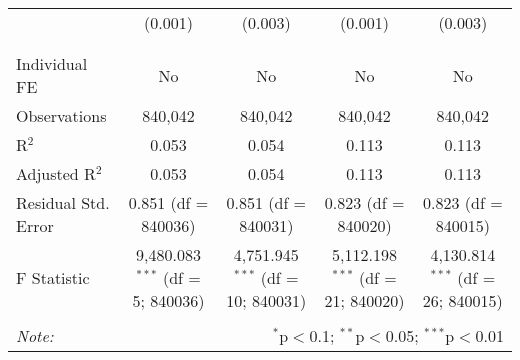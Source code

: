 \documentclass[
]{article}
\begin{document}
\begin{table}[!htbp]
{\begin{tabular}{@{\extracolsep{5pt}}lcccc}
  & (0.001) & (0.003) & (0.001) & (0.003) \\ 
  & & & & \\ 
\hline \\[-1.8ex] 
Individual FE & No & No & No & No \\ 
Observations & 840,042 & 840,042 & 840,042 & 840,042 \\ 
R$^{2}$ & 0.053 & 0.054 & 0.113 & 0.113 \\ 
Adjusted R$^{2}$ & 0.053 & 0.054 & 0.113 & 0.113 \\ 
Residual Std. Error & 0.851 (df = 840036) & 0.851 (df = 840031) & 0.823 (df = 840020) & 0.823 (df = 840015) \\ 
F Statistic & 9,480.083$^{***}$ (df = 5; 840036) & 4,751.945$^{***}$ (df = 10; 840031) & 5,112.198$^{***}$ (df = 21; 840020) & 4,130.814$^{***}$ (df = 26; 840015) \\ 
\hline 
\hline \\[-1.8ex] 
\textit{Note:}  & \multicolumn{4}{r}{$^{*}$p$<$0.1; $^{**}$p$<$0.05; $^{***}$p$<$0.01} \\ 
\end{tabular}
} 
\end{table} 
\newpage
\end{document}
